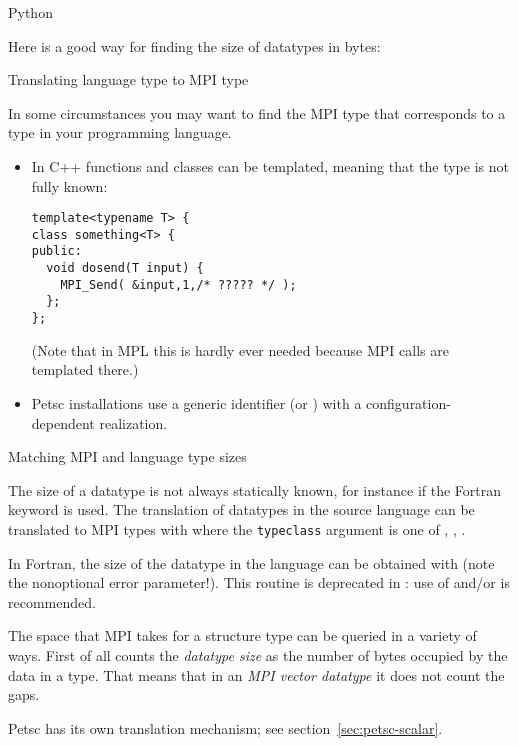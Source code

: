 {Python}

Here is a good way for finding the size of  datatypes
in bytes:

 {Translating language type to MPI type}

In some circumstances you may want to find the MPI type
that corresponds to a type in your programming language.
\begin{itemize}
\item In C++ functions and classes can be templated,
  meaning that the type is not fully known:
\begin{lstlisting}
template<typename T> {
class something<T> {
public:
  void dosend(T input) {
    MPI_Send( &input,1,/* ????? */ );
  };
};
\end{lstlisting}
(Note that in \ac{MPL} this is hardly ever needed
because MPI calls are templated there.)
\item Petsc installations use a generic identifier 
  (or )
  with a configuration-dependent realization.
\end{itemize}

 {Matching MPI and language type sizes}
\label{sec:mpi-type-match}

The size of a datatype is not always statically known, for instance if
the Fortran  keyword is used. The translation of
datatypes in the source language can be translated to MPI types with
%
%
where the \lstinline{typeclass} argument is one of
,
,
.


In Fortran, the size of the datatype in the language can be obtained with
 (note the nonoptional error parameter!).
This routine is deprecated in : use of
 and/or  is recommended.


The space that MPI takes for a structure type can be queried in a
variety of ways. First of all  counts the
\emph{datatype size} as the 
number of bytes occupied by the data in a type. That means that in an
\emph{MPI vector datatype} it does not
count the gaps.
%

\begin{comment}
In C, the \indexmpidef{MPI_Datatype} type is defined through the pre-processor,
allowing you to write:
\cverbatimsnippet{datatypevar}
\end{comment}

Petsc has its own translation mechanism; see section~\ref{sec:petsc-scalar}.


